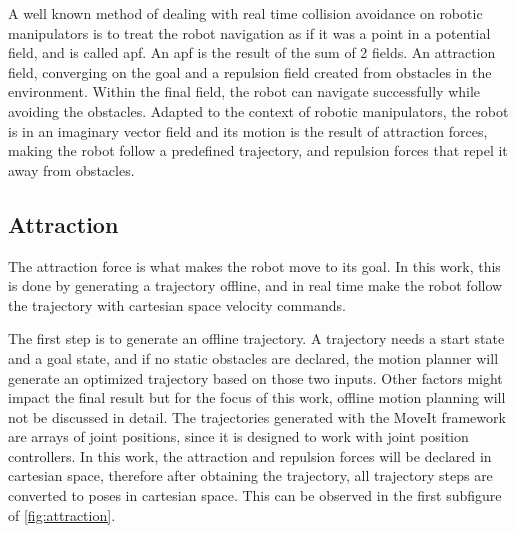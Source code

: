 \par A well known method of dealing with real time collision avoidance on robotic manipulators is to treat the robot navigation as if it was a point in a potential field, and is called \ac{apf}. An \ac{apf} is the result of the sum of 2 fields. An attraction field, converging on the goal and a repulsion field created from obstacles in the environment. Within the final field, the robot can navigate successfully while avoiding the obstacles. Adapted to the context of robotic manipulators, the robot is in an imaginary vector field and its motion is the result of attraction forces, making the robot follow a predefined trajectory, and repulsion forces that repel it away from obstacles.

\subsection{Attraction}
\label{ssec:attraction}

\par The attraction force is what makes the robot move to its goal. In this work, this is done by generating a trajectory offline, and in real time make the robot follow the trajectory with cartesian space velocity commands. 
\par The first step is to generate an offline trajectory. A trajectory needs a start state and a goal state, and if no static obstacles are declared, the motion planner will generate an optimized trajectory based on those two inputs. Other factors might impact the final result but for the focus of this work, offline motion planning will not be discussed in detail. The trajectories generated with the MoveIt framework are arrays of joint positions, since it is designed to work with joint position controllers. In this work, the attraction and repulsion forces will be declared in cartesian space, therefore after obtaining the trajectory, all trajectory steps are converted to poses in cartesian space. This can be observed in the first subfigure of \autoref{fig:attraction}.

